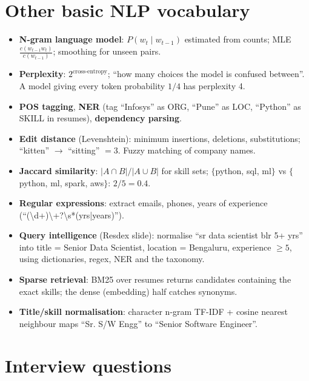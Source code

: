 \section{Other basic NLP vocabulary}
\begin{itemize}
\item \textbf{N-gram language model}: $P(w_t\mid w_{t-1})$ estimated from counts; MLE $\frac{c(w_{t-1}w_t)}{c(w_{t-1})}$; smoothing for unseen pairs.
\item \textbf{Perplexity}: $2^{\text{cross-entropy}}$; ``how many choices the model is confused between''. A model giving every token probability
  $1/4$ has perplexity 4.
\item \textbf{POS tagging}, \textbf{NER} (tag ``Infosys'' as ORG, ``Pune'' as LOC, ``Python'' as SKILL in resumes), \textbf{dependency parsing}.
\item \textbf{Edit distance} (Levenshtein): minimum insertions, deletions, substitutions; ``kitten'' $\to$ ``sitting'' $= 3$. Fuzzy matching of
  company names.
\item \textbf{Jaccard similarity}: $|A\cap B|/|A\cup B|$ for skill sets; $\{$python, sql, ml$\}$ vs $\{$python, ml, spark, aws$\}$: $2/5 = 0.4$.
\item \textbf{Regular expressions}: extract emails, phones, years of experience (``(\textbackslash d+)\textbackslash+?\textbackslash s*(yrs|years)'').
\end{itemize}

\begin{practical}
\begin{itemize}
\item \textbf{Query intelligence} (Resdex slide): normalise ``sr data scientist blr 5+ yrs'' into title = Senior Data Scientist, location =
  Bengaluru, experience $\ge5$, using dictionaries, regex, NER and the taxonomy.
\item \textbf{Sparse retrieval}: BM25 over resumes returns candidates containing the exact skills; the dense (embedding) half catches synonyms.
\item \textbf{Title/skill normalisation}: character n-gram TF-IDF + cosine nearest neighbour maps ``Sr. S/W Engg'' to ``Senior Software Engineer''.
\end{itemize}
\end{practical}

\section{Interview questions}

